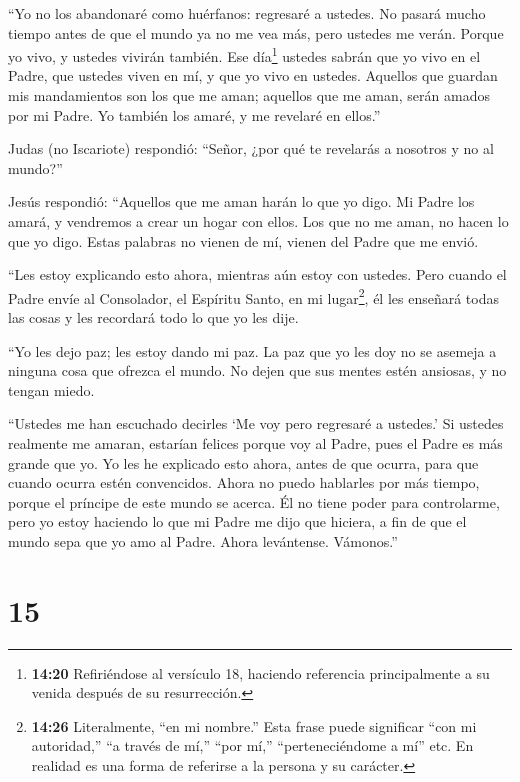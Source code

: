  ``Yo no los abandonaré como huérfanos: regresaré a
ustedes.  No pasará mucho tiempo antes de que el mundo ya
no me vea más, pero ustedes me verán. Porque yo vivo, y ustedes vivirán
también.  Ese día\footnote{\textbf{14:20} Refiriéndose al
  versículo 18, haciendo referencia principalmente a su venida después
  de su resurrección.} ustedes sabrán que yo vivo en el Padre, que
ustedes viven en mí, y que yo vivo en ustedes.  Aquellos
que guardan mis mandamientos son los que me aman; aquellos que me aman,
serán amados por mi Padre. Yo también los amaré, y me revelaré en
ellos.''

 Judas (no Iscariote) respondió: ``Señor, ¿por qué te
revelarás a nosotros y no al mundo?''

 Jesús respondió: ``Aquellos que me aman harán lo que yo
digo. Mi Padre los amará, y vendremos a crear un hogar con ellos.
 Los que no me aman, no hacen lo que yo digo. Estas
palabras no vienen de mí, vienen del Padre que me envió.

 ``Les estoy explicando esto ahora, mientras aún estoy con
ustedes.  Pero cuando el Padre envíe al Consolador, el
Espíritu Santo, en mi lugar\footnote{\textbf{14:26} Literalmente, ``en
  mi nombre.'' Esta frase puede significar ``con mi autoridad,'' ``a
  través de mí,'' ``por mí,'' ``perteneciéndome a mí'' etc. En realidad
  es una forma de referirse a la persona y su carácter.}, él les
enseñará todas las cosas y les recordará todo lo que yo les dije.

 ``Yo les dejo paz; les estoy dando mi paz. La paz que yo
les doy no se asemeja a ninguna cosa que ofrezca el mundo. No dejen que
sus mentes estén ansiosas, y no tengan miedo.

 ``Ustedes me han escuchado decirles `Me voy pero regresaré
a ustedes.' Si ustedes realmente me amaran, estarían felices porque voy
al Padre, pues el Padre es más grande que yo.  Yo les he
explicado esto ahora, antes de que ocurra, para que cuando ocurra estén
convencidos.  Ahora no puedo hablarles por más tiempo,
porque el príncipe de este mundo se acerca. Él no tiene poder para
controlarme,  pero yo estoy haciendo lo que mi Padre me
dijo que hiciera, a fin de que el mundo sepa que yo amo al Padre. Ahora
levántense. Vámonos.''

\hypertarget{section-14}{%
\section{15}\label{section-14}}

